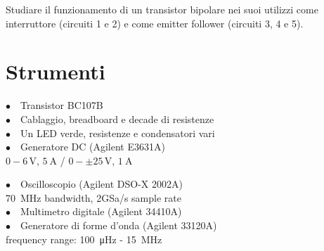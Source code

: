 Studiare il funzionamento di un transistor bipolare nei suoi utilizzi come interruttore (circuiti 1 e 2) e come emitter follower (circuiti 3, 4 e 5).

\section{Strumenti}
%
\noindent
\begin{minipage}{.5\linewidth}
$\bullet \quad$Transistor BC107B\\
$\bullet \quad$Cablaggio, breadboard e decade di resistenze\\
$\bullet \quad$Un LED verde, resistenze e condensatori vari\\
$\bullet \quad$Generatore DC (Agilent E3631A)\\
\phantom{xxxx}$0-6\,\si{\volt}$, $\SI{5}{\ampere}$ / $0-\pm25\,\si{\volt}$, $\SI{1}{\ampere}$\\
\end{minipage}%
\begin{minipage}{.5\linewidth}
$\bullet \quad$Oscilloscopio (Agilent DSO-X 2002A)\\
\phantom{xxxx}\SI{70}{\mega\hertz} bandwidth, 2GSa/s sample rate\\
$\bullet \quad$Multimetro digitale (Agilent 34410A)\\
$\bullet \quad$Generatore di forme d'onda (Agilent 33120A)\\
\phantom{xxxx}frequency range: \SI{100}{\micro\hertz} - \SI{15}{\mega\hertz}\\
\end{minipage}